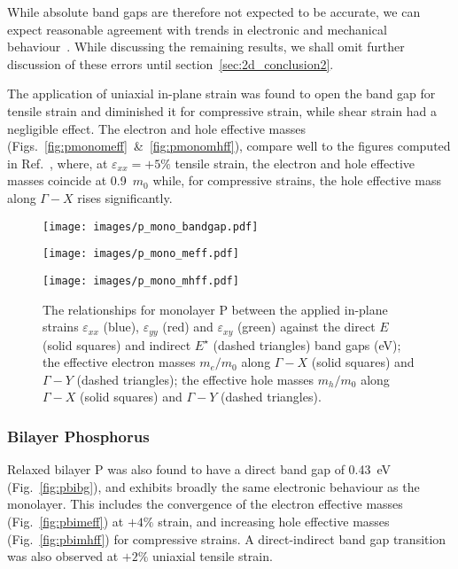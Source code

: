 While absolute band gaps 
are therefore not expected to be accurate,  
we can expect reasonable agreement 
with trends in electronic and 
mechanical behaviour~\cite{1402-4896-2004-T109-001,doi:10.1021/cr200107z}.
%
While discussing the remaining results, 
we shall omit further discussion of these errors 
until section~\ref{sec:2d_conclusion2}.

The application of uniaxial in-plane strain 
was found to open the band gap for tensile strain 
and diminished it for compressive strain,  
while shear strain had a negligible effect.
%
The electron and hole effective masses 
(Figs.~\ref{fig:pmonomeff}~\&~\ref{fig:pmonomhff}), 
compare well to the figures computed in Ref.~\cite{Wang2015},
where, at $\varepsilon_{xx}=+5\%$ tensile strain,  
the electron and hole effective masses   
coincide at 0.9~$m_0$ while, 
for compressive strains, 
the hole effective mass along 
$\Gamma-X$ rises significantly.

\begin{figure}[th!]
\begin{subfloat}{
\texttt{[image: images/p\_mono\_bandgap.pdf]}
  \label{fig:pmonobg}}
\end{subfloat}
%
\begin{subfloat}[Monolayer P $m_e/m_0$]{
\texttt{[image: images/p\_mono\_meff.pdf]}
  \label{fig:pmonomeff}}
\end{subfloat}
%
\begin{subfloat}[Monolayer P $m_h/m_0$]{
\texttt{[image: images/p\_mono\_mhff.pdf]}
  \label{fig:pmonomhff}}
\end{subfloat}
%
\caption[Electronic properties of monolayer phosphorus for in-plane strains]
{The relationships for monolayer P between 
the applied in-plane strains $\varepsilon_{xx}$ (blue),
$\varepsilon_{yy}$ (red) and $\varepsilon_{xy}$ (green) against 
%
\protect{}
the direct $E$ (solid  squares) and 
indirect $E^\star$ (dashed triangles) band gaps (eV);
%
\protect{}
the effective electron masses $m_e/m_0$ 
along $\Gamma-X$ (solid squares) and 
$\Gamma-Y$ (dashed triangles);
%
\protect{} 
the effective hole masses $m_h/m_0$ 
along $\Gamma-X$ (solid squares) and 
$\Gamma-Y$ (dashed triangles).}
\label{fig:p_mono_elec_properties}
\end{figure}


\subsubsection{Bilayer Phosphorus}
Relaxed bilayer P was also found 
to have a direct band gap of 
0.43~eV (Fig.~\ref{fig:pbibg}), 
and exhibits broadly the same 
electronic behaviour as the monolayer.
%
This includes 
the convergence of the electron effective masses 
(Fig.~\ref{fig:pbimeff}) 
at $+4\%$ strain, 
and increasing hole effective masses 
(Fig.~\ref{fig:pbimhff})
for compressive strains.
%
A direct-indirect band gap transition 
was also observed at 
$+2\%$ uniaxial tensile strain. 

